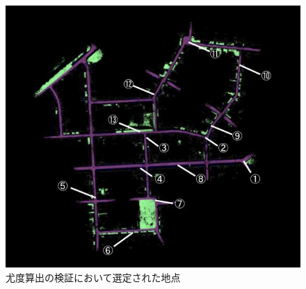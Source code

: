 \begin{figure}[htpb]
\begin{minipage}[b]{1.0\hsize}
\begin{center}
    \includegraphics[width=120mm]{./picture/sequence00_pointmap.jpg}
\end{center}
\caption{尤度算出の検証において選定された地点}
\label{fig:sequence00_place}
\end{minipage}
\end{figure}

